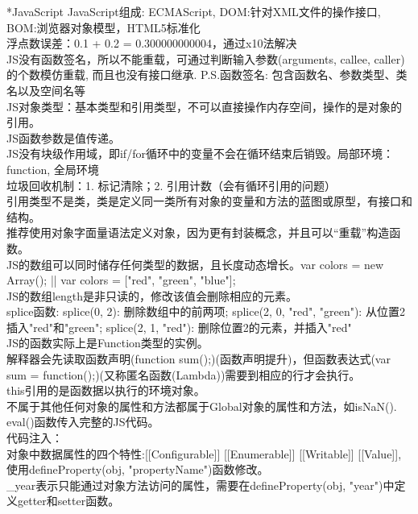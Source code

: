 \documentclass[UTF8]{ctexart}
\makeatletter
\renewcommand{\section}{\@startsection{section}{1}{0mm}
  {-\baselineskip}{0.5\baselineskip}{\bf\leftline}}
\makeatother
\begin{document}
\section*{JavaScript}
\noindent JavaScript组成: ECMAScript, DOM:针对XML文件的操作接口, BOM:浏览器对象模型，HTML5标准化\\
浮点数误差：0.1 + 0.2 = 0.300000000004，通过x10法解决\\
JS没有函数签名，所以不能重载，可通过判断输入参数(arguments, callee, caller)的个数模仿重载, 而且也没有接口继承. P.S.函数签名: 包含函数名、参数类型、类名以及空间名等\\
JS对象类型：基本类型和引用类型，不可以直接操作内存空间，操作的是对象的引用。\\
JS函数参数是值传递。\\
JS没有块级作用域，即if/for循环中的变量不会在循环结束后销毁。局部环境：function, 全局环境\\
垃圾回收机制：1. 标记清除；2. 引用计数（会有循环引用的问题）\\
引用类型不是类，类是定义同一类所有对象的变量和方法的蓝图或原型，有接口和结构。\\
推荐使用对象字面量语法定义对象，因为更有封装概念，并且可以“重载”构造函数。\\
JS的数组可以同时储存任何类型的数据，且长度动态增长。var colors = new Array(); || var colors = ["red", "green", "blue"];\\
JS的数组length是非只读的，修改该值会删除相应的元素。\\
splice函数: splice(0, 2): 删除数组中的前两项; splice(2, 0, "red", "green"): 从位置2插入"red"和"green"; splice(2, 1, "red"): 删除位置2的元素，并插入"red"\\
JS的函数实际上是Function类型的实例。\\
解释器会先读取函数声明(function sum(){};)(函数声明提升)，但函数表达式(var sum = function(){};)(又称匿名函数(Lambda))需要到相应的行才会执行。\\
this引用的是函数据以执行的环境对象。\\
不属于其他任何对象的属性和方法都属于Global对象的属性和方法，如isNaN().\\
eval()函数传入完整的JS代码。\\
代码注入：\\
对象中数据属性的四个特性:[[Configurable]] [[Enumerable]] [[Writable]] [[Value]], 使用defineProperty(obj, "propertyName")函数修改。\\
\_year表示只能通过对象方法访问的属性，需要在defineProperty(obj, "year")中定义getter和setter函数。\\
\end{document}
